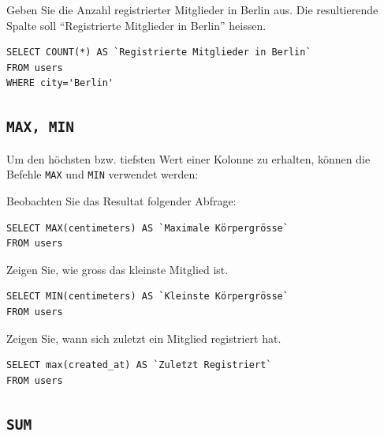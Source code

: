 \begin{myexercise}
  Geben Sie die Anzahl registrierter Mitglieder in Berlin aus. Die resultierende Spalte soll \enquote{Registrierte Mitglieder in Berlin} heissen.
  \begin{myanswer}
    \begin{lstlisting}
SELECT COUNT(*) AS `Registrierte Mitglieder in Berlin`
FROM users
WHERE city='Berlin'
\end{lstlisting}
  \end{myanswer}
\end{myexercise}

\subsection{\texorpdfstring{\lstinline|MAX, MIN|}{MAX, MIN}}

Um den höchsten bzw. tiefsten Wert einer Kolonne zu erhalten, können die Befehle \lstinline|MAX| und \lstinline|MIN| verwendet werden:

\begin{myexample}
Beobachten Sie das Resultat folgender Abfrage:

\begin{lstlisting}
SELECT MAX(centimeters) AS `Maximale Körpergrösse`
FROM users
\end{lstlisting}
\end{myexample}

\begin{myexercise}
  Zeigen Sie, wie gross das kleinste Mitglied ist.
  \begin{myanswer}
    \begin{lstlisting}
SELECT MIN(centimeters) AS `Kleinste Körpergrösse`
FROM users
\end{lstlisting}
  \end{myanswer}
\end{myexercise}
\begin{myexercise}
  Zeigen Sie, wann sich zuletzt ein Mitglied registriert hat.
  \begin{myanswer}
    \begin{lstlisting}
SELECT max(created_at) AS `Zuletzt Registriert`
FROM users
\end{lstlisting}
  \end{myanswer}
\end{myexercise}


\subsection{\texorpdfstring{\lstinline|SUM|}{SUM}}

